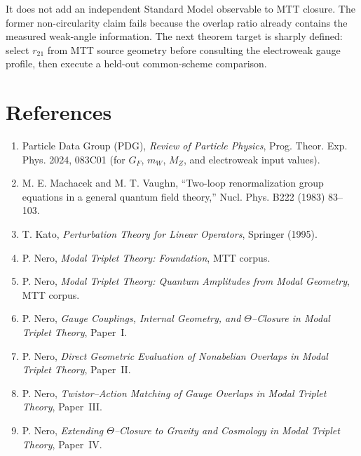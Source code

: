 \documentclass[11pt]{article}
\begin{document}
It does not add an independent Standard Model observable to MTT closure. The
former non-circularity claim fails because the overlap ratio already contains
the measured weak-angle information. The next theorem target is sharply
defined: select $r_{21}$ from MTT source geometry before consulting the
electroweak gauge profile, then execute a held-out common-scheme comparison.


\section*{References}

\begin{enumerate}

\item Particle Data Group (PDG),
\emph{Review of Particle Physics},
Prog. Theor. Exp. Phys. 2024, 083C01
(for $G_F$, $m_W$, $M_Z$, and electroweak input values).

\item M. E. Machacek and M. T. Vaughn,
``Two-loop renormalization group equations in a general quantum field theory,''
Nucl. Phys. B222 (1983) 83--103.

\item T. Kato,
\emph{Perturbation Theory for Linear Operators},
Springer (1995).

\item P. Nero,
\emph{Modal Triplet Theory: Foundation},
MTT corpus.

\item P. Nero,
\emph{Modal Triplet Theory: Quantum Amplitudes from Modal Geometry},
MTT corpus.

\item P. Nero,
\emph{Gauge Couplings, Internal Geometry, and $\Theta$--Closure in Modal Triplet Theory},
Paper~I.

\item P. Nero,
\emph{Direct Geometric Evaluation of Nonabelian Overlaps in Modal Triplet Theory},
Paper~II.

\item P. Nero,
\emph{Twistor--Action Matching of Gauge Overlaps in Modal Triplet Theory},
Paper~III.

\item P. Nero,
\emph{Extending $\Theta$--Closure to Gravity and Cosmology in Modal Triplet Theory},
Paper~IV.



\end{enumerate}
\end{document}
